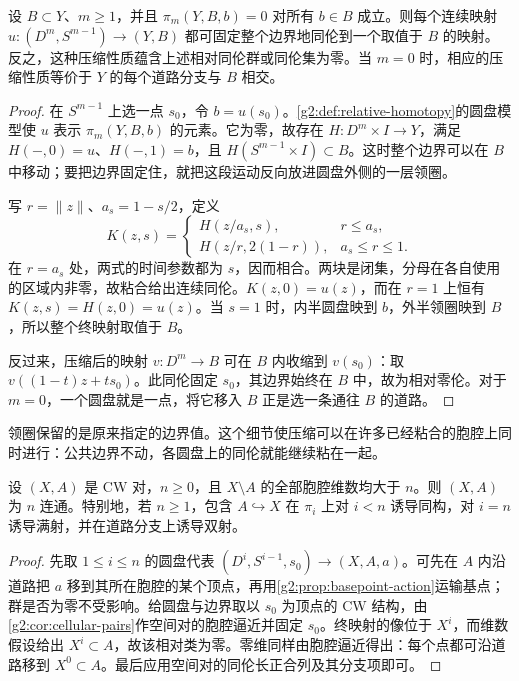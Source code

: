 \begin{lemma}\label{g2:lem:disk-compression}
	设 \(B\subset Y\)、\(m\ge1\)，并且 \(\pi_m(Y,B,b)=0\) 对所有 \(b\in B\) 成立。则每个连续映射 \(u:(D^m,S^{m-1})\rightarrow(Y,B)\) 都可固定整个边界地同伦到一个取值于 \(B\) 的映射。反之，这种压缩性质蕴含上述相对同伦群或同伦集为零。当 \(m=0\) 时，相应的压缩性质等价于 \(Y\) 的每个道路分支与 \(B\) 相交。
\end{lemma}
\begin{proof}
	在 \(S^{m-1}\) 上选一点 \(s_0\)，令 \(b=u(s_0)\)。\cref{g2:def:relative-homotopy}的圆盘模型使 \(u\) 表示 \(\pi_m(Y,B,b)\) 的元素。它为零，故存在 \(H:D^m\times I\rightarrow Y\)，满足 \(H(-,0)=u\)、\(H(-,1)=b\)，且 \(H(S^{m-1}\times I)\subset B\)。这时整个边界可以在 \(B\) 中移动；要把边界固定住，就把这段运动反向放进圆盘外侧的一层领圈。

	写 \(r=\lVert z\rVert\)、\(a_s=1-s/2\)，定义
	\[
		K(z,s)=\begin{cases}
			H(z/a_s,s),&r\le a_s,\\
			H(z/r,2(1-r)),&a_s\le r\le1.
		\end{cases}
	\]
	在 \(r=a_s\) 处，两式的时间参数都为 \(s\)，因而相合。两块是闭集，分母在各自使用的区域内非零，故粘合给出连续同伦。\(K(z,0)=u(z)\)，而在 \(r=1\) 上恒有 \(K(z,s)=H(z,0)=u(z)\)。当 \(s=1\) 时，内半圆盘映到 \(b\)，外半领圈映到 \(B\)，所以整个终映射取值于 \(B\)。

	反过来，压缩后的映射 \(v:D^m\rightarrow B\) 可在 \(B\) 内收缩到 \(v(s_0)\)：取 \(v((1-t)z+ts_0)\)。此同伦固定 \(s_0\)，其边界始终在 \(B\) 中，故为相对零伦。对于 \(m=0\)，一个圆盘就是一点，将它移入 \(B\) 正是选一条通往 \(B\) 的道路。
\end{proof}

领圈保留的是原来指定的边界值。这个细节使压缩可以在许多已经粘合的胞腔上同时进行：公共边界不动，各圆盘上的同伦就能继续粘在一起。

\begin{proposition}\label{g2:prop:cell-dimension-connectivity}
	设 \((X,A)\) 是 CW 对，\(n\ge0\)，且 \(X\setminus A\) 的全部胞腔维数均大于 \(n\)。则 \((X,A)\) 为 \(n\) 连通。特别地，若 \(n\ge1\)，包含 \(A\hookrightarrow X\) 在 \(\pi_i\) 上对 \(i<n\) 诱导同构，对 \(i=n\) 诱导满射，并在道路分支上诱导双射。
\end{proposition}
\begin{proof}
	先取 \(1\le i\le n\) 的圆盘代表 \((D^i,S^{i-1},s_0)\rightarrow(X,A,a)\)。可先在 \(A\) 内沿道路把 \(a\) 移到其所在胞腔的某个顶点，再用\cref{g2:prop:basepoint-action}运输基点；群是否为零不受影响。给圆盘与边界取以 \(s_0\) 为顶点的 CW 结构，由\cref{g2:cor:cellular-pairs}作空间对的胞腔逼近并固定 \(s_0\)。终映射的像位于 \(X^i\)，而维数假设给出 \(X^i\subset A\)，故该相对类为零。零维同样由胞腔逼近得出：每个点都可沿道路移到 \(X^0\subset A\)。最后应用空间对的同伦长正合列及其分支项即可。
\end{proof}

